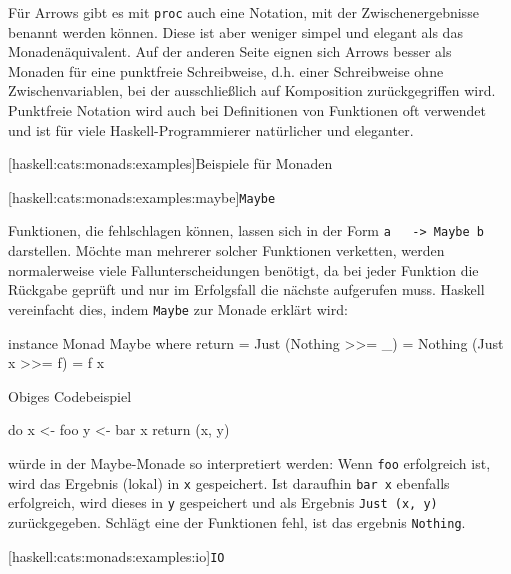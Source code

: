 \documentclass[11pt, a4paper, bibgerm]{book}
\newcommand\icode[1]{\lstinline?#1?}
\newcommand\lsubsubsection{}
\newcommand\lparagraph{}
\begin{document}
Für Arrows gibt es mit \icode{proc} auch eine Notation, mit der
Zwischenergebnisse benannt werden können. Diese ist aber weniger simpel
und elegant als das Monadenäquivalent. Auf der anderen Seite eignen sich
Arrows besser als Monaden für eine punktfreie Schreibweise, d.h. einer
Schreibweise ohne Zwischenvariablen, bei der ausschließlich auf
Komposition zurückgegriffen wird. Punktfreie Notation wird auch bei
Definitionen von Funktionen oft verwendet und ist für viele
Haskell-Programmierer natürlicher und eleganter.

\lsubsubsection[haskell:cats:monads:examples]{Beispiele für Monaden}

\lparagraph[haskell:cats:monads:examples:maybe]{\icode{Maybe}}

Funktionen, die fehlschlagen können, lassen sich in der Form \icode{a
  -> Maybe b} darstellen. Möchte man mehrerer solcher Funktionen
verketten, werden normalerweise viele Fallunterscheidungen benötigt, da
bei jeder Funktion die Rückgabe geprüft und nur im Erfolgsfall die
nächste aufgerufen muss. Haskell vereinfacht dies, indem \icode{Maybe}
zur Monade erklärt wird:
\begin{code}
instance Monad Maybe
  where return = Just
        (Nothing >>= _) = Nothing
        (Just x  >>= f) = f x
\end{code} %
Obiges Codebeispiel
\begin{code}
do x <- foo
   y <- bar x
   return (x, y)
\end{code}
würde in der Maybe-Monade so interpretiert werden: Wenn \icode{foo}
erfolgreich ist, wird das Ergebnis (lokal) in \icode{x} gespeichert. Ist
daraufhin \icode{bar x} ebenfalls erfolgreich, wird dieses in \icode{y}
gespeichert und als Ergebnis \icode{Just (x, y)} zurückgegeben. Schlägt
eine der Funktionen fehl, ist das ergebnis \icode{Nothing}.

\lparagraph[haskell:cats:monads:examples:io]{\icode{IO}}
\end{document}
